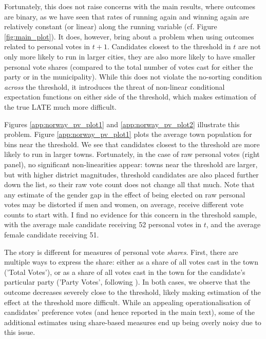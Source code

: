 \documentclass[12pt]{article}
\begin{document}
Fortunately, this does not raise concerns with the main results, where outcomes are binary, as we have seen that rates of running again and winning again are relatively constant (or linear) along the running variable (cf. Figure \ref{fig:main_plot}). It does, however, bring about a problem when using outcomes related to personal votes in $t+1$. Candidates closest to the threshold in $t$ are not only more likely to run in larger cities, they are also more likely to have smaller personal vote shares (compared to the total number of votes cast for either the party or in the municipality). While this does not violate the no-sorting condition \emph{across} the threshold, it introduces the threat of non-linear conditional expectation functions on either side of the threshold, which makes estimation of the true LATE much more difficult.

Figures \ref{app:norway_pv_plot1} and \ref{app:norway_pv_plot2} illustrate this problem. Figure \ref{app:norway_pv_plot1} plots the average town population for bins near the threshold. We see that candidates closest to the threshold are more likely to run in larger towns. Fortunately, in the case of raw personal votes (right panel), no significant non-linearities appear: towns near the threshold are larger, but with higher district magnitudes, threshold candidates are also placed further down the list, so their raw vote count does not change all that much. Note that any estimate of the gender gap in the effect of being elected on raw personal votes may be distorted if men and women, on average, receive different vote counts to start with. I find no evidence for this concern in the threshold sample, with the average male candidate receiving 52 personal votes in $t$, and the average female candidate receiving 51.

The story is different for measures of personal vote \emph{shares}. First, there are multiple ways to express the share: either as a share of all votes cast in the town ('Total Votes'), or as a share of all votes cast in the town for the candidate's particular party ('Party Votes', following \citet{fiva2018b}). In both cases, we observe that the outcome decreases severely close to the threshold, likely making estimation of the effect at the threshold more difficult. While an appealing operationalisation of candidates' preference votes (and hence reported in the main text), some of the additional estimates using share-based measures end up being overly noisy due to this issue.
\end{document}
